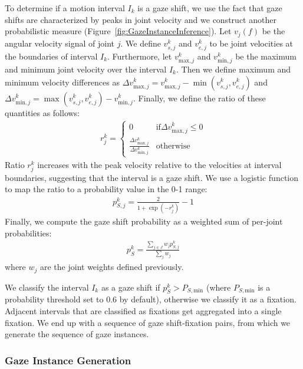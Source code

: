To determine if a motion interval $I_k$ is a gaze shift, we use the fact that gaze shifts are characterized by peaks in joint velocity and we construct another probabilistic measure (Figure~\ref{fig:GazeInstanceInference}). Let $v_j(f)$ be the angular velocity signal of joint $j$. We define $v_{s,j}^k$ and $v_{e,j}^k$ to be joint velocities at the boundaries of interval $I_k$. Furthermore, let $v_{\mathrm{max},j}^k$ and $v_{\mathrm{min},j}^k$ be the maximum and minimum joint velocity over the interval $I_k$. Then we define maximum and minimum velocity differences as $\Delta v_{\mathrm{max},j}^k = v_{\mathrm{max},j}^k - \mathop{min} (v_{s,j}^k, v_{e,j}^k)$ and $\Delta v_{\mathrm{min},j}^k = \mathop{max} (v_{s,j}^k, v_{e,j}^k) - v_{\mathrm{min},j}^k$. Finally, we define the ratio of these quantities as follows:
%
\begin{align} \label{eq:GazeShiftRatio}
r_j^k =
\begin{cases}
0 & \text{if} \Delta v_{\mathrm{max},j}^k \leq 0 \\
\frac{\Delta v_{\mathrm{max},j}^k}{\Delta v_{\mathrm{min},j}^k} & \text{otherwise}
\end{cases}
\end{align}
%
Ratio $r_j^k$ increases with the peak velocity relative to the velocities at interval boundaries, suggesting that the interval is a gaze shift. We use a logistic function to map the ratio to a probability value in the 0-1 range:
%
\begin{align} \label{eq:GazeShiftProbability}
p_{S,j}^k = \frac{2}{1 + \mathop{exp}(-r_j^k)} - 1
\end{align}
%
Finally, we compute the gaze shift probability as a weighted sum of per-joint probabilities:
%
\begin{align} \label{eq:GazeShiftGlobalProbability}
p_S^k = \frac{\sum_{j \in J} w_j p_{S,j}^k}{\sum_j w_j}
\end{align}
%
where $w_j$ are the joint weights defined previously.

We classify the interval $I_k$ as a gaze shift if $p_S^k > P_{S,\mathrm{min}}$ (where $P_{S,\mathrm{min}}$ is a probability threshold set to 0.6 by default), otherwise we classify it as a fixation. Adjacent intervals that are classified as fixations get aggregated into a single fixation. We end up with a sequence of gaze shift-fixation pairs, from which we generate the sequence of gaze instances.

\subsubsection{Gaze Instance Generation}

